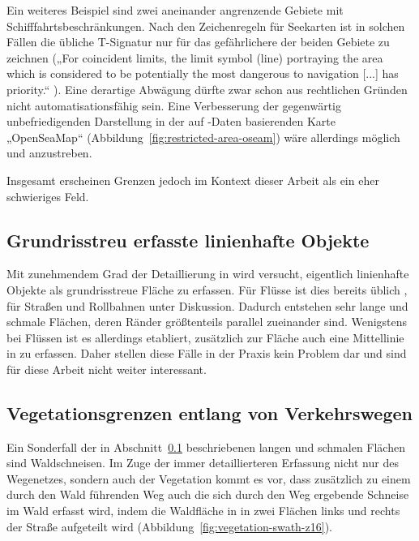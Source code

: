 \documentclass[../main/thesis.tex]{subfiles}
\begin{document}
Ein weiteres Beispiel sind zwei aneinander angrenzende Gebiete mit Schifffahrtsbeschränkungen.
Nach den Zeichenregeln für Seekarten ist in solchen Fällen die übliche T-Signatur  nur für das gefährlichere der beiden Gebiete zu zeichnen („For coincident limits, the limit symbol (line) portraying the area which is considered to be potentially the most dangerous to navigation [...] has priority.“ ).
Eine derartige Abwägung dürfte zwar schon aus rechtlichen Gründen nicht automatisationsfähig sein.
Eine Verbesserung der gegenwärtig unbefriedigenden Darstellung in der auf \osm-Daten basierenden Karte „OpenSeaMap“ (Abbildung~\ref{fig:restricted-area-oseam}) wäre allerdings möglich und anzustreben.

Insgesamt erscheinen Grenzen jedoch im Kontext dieser Arbeit als ein eher schwieriges Feld.


\subsection{Grundrisstreu erfasste linienhafte Objekte}
\label{ground-plan-linear-objects-case-desc}

Mit zunehmendem Grad der Detaillierung in \osm{} wird versucht, eigentlich linienhafte Objekte als grundrisstreue Fläche zu erfassen.
Für Flüsse ist dies bereits üblich , für Straßen und Rollbahnen unter Diskussion.
Dadurch entstehen sehr lange und schmale Flächen, deren Ränder größtenteils parallel zueinander sind.
Wenigstens bei Flüssen ist es allerdings etabliert, zusätzlich zur Fläche auch eine Mittellinie in \osm{} zu erfassen.
Daher stellen diese Fälle in der Praxis kein Problem dar und sind für diese Arbeit nicht weiter interessant.


\subsection{Vegetationsgrenzen entlang von Verkehrswegen}

Ein Sonderfall der in Abschnitt~\ref{ground-plan-linear-objects-case-desc} beschriebenen langen und schmalen Flächen sind Waldschneisen.
Im Zuge der immer detaillierteren Erfassung nicht nur des Wegenetzes, sondern auch der Vegetation kommt es vor, dass zusätzlich zu einem durch den Wald führenden Weg auch die sich durch den Weg ergebende Schneise im Wald erfasst wird, indem die Waldfläche in \osm{} in zwei Flächen links und rechts der Straße aufgeteilt wird (Abbildung~\ref{fig:vegetation-swath-z16}).
\end{document}
